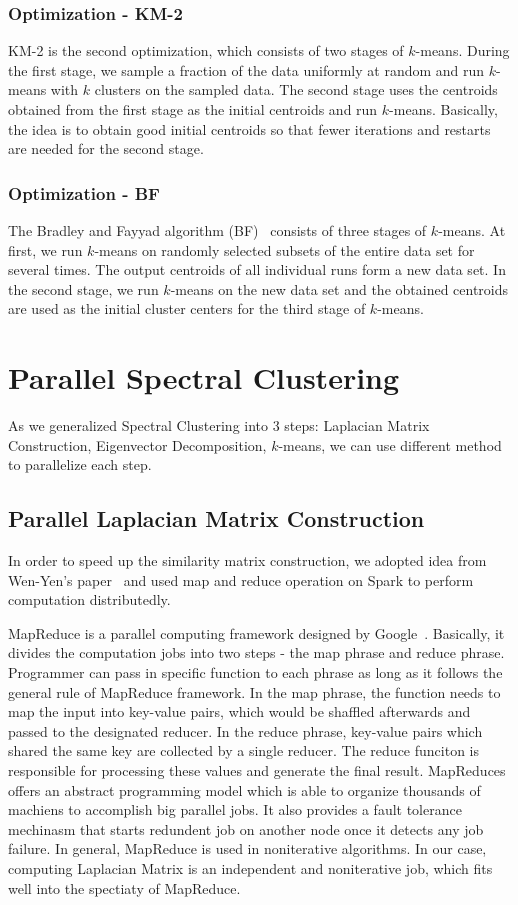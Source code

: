 \documentclass{acm_proc_article-sp}
\begin{document}
\subsubsection{Optimization - KM-2}
KM-2 is the second optimization, which consists of two stages of $k$-means. During the first stage, we sample a fraction of the data uniformly at random and run $k$-means with $k$ clusters on the sampled data. The second stage uses the centroids obtained from the first stage as the initial centroids and run $k$-means. Basically, the idea is to obtain good initial centroids so that fewer iterations and restarts are needed for the second stage.
\subsubsection{Optimization - BF}
The Bradley and Fayyad algorithm (BF)~\cite{bradley1998refining} consists of three stages of $k$-means. At first, we run $k$-means on randomly selected subsets of the entire data set for several times. The output centroids of all individual runs form a new data set. In the second stage, we run $k$-means on the new data set and the obtained centroids are used as the initial cluster centers for the third stage of $k$-means.

\section{Parallel Spectral Clustering}
As we generalized Spectral Clustering into 3 steps: Laplacian Matrix Construction, Eigenvector Decomposition, $k$-means, we can use different method to parallelize each step.

\subsection{Parallel Laplacian Matrix Construction}
In order to speed up the similarity matrix construction, we adopted idea from Wen-Yen's paper~\cite{chen2011parallel} and used map and reduce operation on Spark to perform computation distributedly.

MapReduce is a parallel computing framework designed by Google~\cite{dean2008mapreduce}. Basically, it divides the computation jobs into two steps - the map phrase and reduce phrase. Programmer can pass in specific function to each phrase as long as it follows the general rule of MapReduce framework. In the map phrase, the function needs to map the input into key-value pairs, which would be shaffled afterwards and passed to the designated reducer. In the reduce phrase, key-value pairs which shared the same key are collected by a single reducer. The reduce funciton is responsible for processing these values and generate the final result. MapReduces offers an abstract programming model which is able to organize thousands of machiens to accomplish big parallel jobs. It also provides a fault tolerance mechinasm that starts redundent job on another node once it detects any job failure. In general, MapReduce is used in noniterative algorithms. In our case, computing Laplacian Matrix is an independent and noniterative job, which fits well into the spectiaty of MapReduce.
\end{document}
